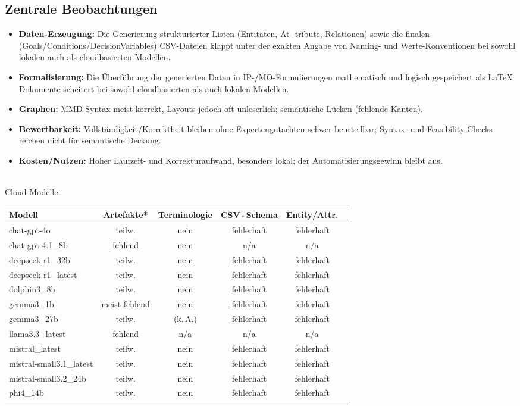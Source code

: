 \documentclass[runningheads]{llncs}
\begin{document}
\subsection{Zentrale Beobachtungen}
\begin{itemize}
  \item \textbf{Daten-Erzeugung:} Die Generierung strukturierter Listen (Entitäten, At-
tribute, Relationen) sowie die finalen (Goals/Conditions/DecisionVariables) CSV-Dateien klappt unter der exakten Angabe von Naming- und Werte-Konventionen bei sowohl lokalen auch als cloudbasierten Modellen.
  \item \textbf{Formalisierung:} Die Überführung der generierten Daten in IP-/MO-Formulierungen mathematisch und logisch gespeichert als LaTeX Dokumente scheitert bei sowohl cloudbasierten als auch lokalen Modellen.
  \item \textbf{Graphen:} MMD-Syntax meist korrekt, Layouts jedoch oft unleserlich; semantische Lücken (fehlende Kanten).
  \item \textbf{Bewertbarkeit:} Vollständigkeit/Korrektheit bleiben ohne Expertengutachten schwer beurteilbar; Syntax- und Feasibility-Checks reichen nicht für semantische Deckung.
  \item \textbf{Kosten/Nutzen:} Hoher Laufzeit- und Korrekturaufwand, besonders lokal; der Automatisierungsgewinn bleibt aus.
\end{itemize} \\

Cloud Modelle: \\
\begin{tabular}{@{} l c c c c p{7.8cm} @{}}
\toprule
\textbf{Modell} & \textbf{Artefakte*} & \textbf{Terminologie} & \textbf{CSV\,-\,Schema} & \textbf{Entity/Attr.} \\
\midrule
chat-gpt-4o & teilw. & nein & fehlerhaft & fehlerhaft \\
chat-gpt-4.1\_8b & fehlend & nein & n/a & n/a \\
deepseek-r1\_32b & teilw. & nein & fehlerhaft & fehlerhaft \\
deepseek-r1\_latest & teilw. & nein & fehlerhaft & fehlerhaft \\
dolphin3\_8b & teilw. & nein & fehlerhaft & fehlerhaft \\
gemma3\_1b & meist fehlend & nein & fehlerhaft & fehlerhaft \\
gemma3\_27b & teilw. & (k.\,A.) & fehlerhaft & fehlerhaft \\
llama3.3\_latest & fehlend & n/a & n/a & n/a \\
mistral\_latest & teilw. & nein & fehlerhaft & fehlerhaft \\
mistral-small3.1\_latest & teilw. & nein & fehlerhaft & fehlerhaft \\
mistral-small3.2\_24b & teilw. & nein & fehlerhaft & fehlerhaft \\
phi4\_14b & teilw. & nein & fehlerhaft & fehlerhaft \\
\bottomrule
\end{tabular}
\end{document}
